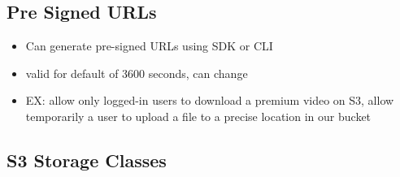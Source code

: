 \documentclass[]{scrartcl}
\begin{document}
\subsection{Pre Signed URLs}
\begin{itemize}
	\item Can generate pre-signed URLs using SDK or CLI
	\item valid for default of 3600 seconds, can change
	\item EX: allow only logged-in users to download a premium video on S3, allow temporarily a user to upload a file to a precise location in our bucket
\end{itemize}

\subsection{S3 Storage Classes}
\end{document}
